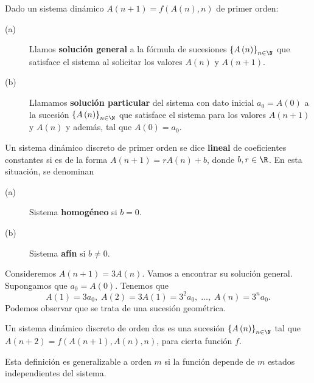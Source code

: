 \begin{fdefinition}[]
\normalfont Dado un sistema dinámico $\displaystyle A\left(n+1\right) = f\left(A\left(n\right),n\right) $ de primer orden:
\begin{description}
	\item[(a)] Llamos \textbf{solución general} a la fórmula de sucesiones $\displaystyle \left\{ A\left(n\right)\right\} _{n\in\N} $ que satisface el sistema al solicitar los valores $\displaystyle A\left(n\right) $ y $\displaystyle A\left(n+1\right) $.
	\item[(b)] Llamamos \textbf{solución particular} del sistema con dato inicial $\displaystyle a_{0} = A\left(0\right) $ a la sucesión $\displaystyle \left\{ A\left(n\right)\right\} _{n\in\N} $ que satisface el sistema para los valores $\displaystyle A\left(n+1\right) $ y $\displaystyle A\left(n\right) $ y además, tal que $\displaystyle A\left(0\right) = a_{0} $.
\end{description}
\end{fdefinition}
\begin{fdefinition}
\normalfont Un sistema dinámico discreto de primer orden se dice \textbf{lineal} de coeficientes constantes si es de la forma $\displaystyle A\left(n+1\right) = rA\left(n\right) + b $, donde $\displaystyle b,r \in \R $. En esta situación, se denominan
\begin{description}
\item[(a)] Sistema \textbf{homogéneo} si $\displaystyle b = 0 $.
\item[(b)] Sistema \textbf{afín} si $\displaystyle b \neq 0 $.
\end{description}
\end{fdefinition}
\begin{eg}
\normalfont Consideremos $\displaystyle A\left(n+1\right) = 3A\left(n\right) $. Vamos a encontrar su solución general. Supongamos que $\displaystyle a_{0} = A\left(0\right) $. Tenemos que 
\[A\left(1\right) = 3a_{0}, \; A\left(2\right) = 3A\left(1\right) = 3^{2}a_{0}, \; \ldots, \; A\left(n\right) = 3^{n}a_{0}.\]
Podemos observar que se trata de una sucesión geométrica. 
\end{eg}
\begin{fdefinition}[]
	\normalfont Un sistema dinámico discreto de orden dos es una sucesión $\displaystyle \left\{ A\left(n\right)\right\} _{n\in\N} $ tal que $\displaystyle A\left(n+2\right) = f\left(A\left(n+1\right), A\left(n\right), n\right) $, para cierta función $\displaystyle f $. 
\end{fdefinition}
\begin{observation}
\normalfont Esta definición es generalizable a orden $\displaystyle m $ si la función depende de $\displaystyle m $ estados independientes del sistema.
\end{observation}
